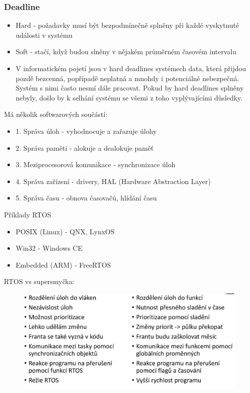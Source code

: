 \subsubsection*{Deadline}
\begin{itemize}
  \item Hard - požadavky musí být bezpodmínečně splněny při každé vyskytnuté události v systému
  \item Soft - stačí, když budou slněny v nějakém průměrném časovém intervalu
  \item V informatickém pojetí jsou v hard deadlines systémech data, která přijdou pozdě bezcenná, popřípadě neplatná a mnohdy i potenciálně nebezpečná. Systém s nimi často nesmí dále pracovat. Pokud by hard deadlines splněny nebyly, došlo by k selhání systému se všemi z toho vyplývajícími důsledky.
\end{itemize}
Má několik softwarových součástí:
\begin{itemize}
  \item 1. Správa úloh - vyhodnocuje a zařazuje úlohy
  \item 2. Správa paměti - alokuje a dealokuje paměť 
  \item 3. Meziprocesorová komunikace - synchronizace úloh
  \item 4. Správa zařízení - drivery, HAL (Hardware Abstraction Layer)
  \item 5. Správa času - obnova časovačů, hlídání času
\end{itemize}

Příklady RTOS
\begin{itemize}
  \item POSIX (Linux) - QNX, LynxOS
  \item Win32 - Windows CE
  \item Embedded (ARM) - FreeRTOS
\end{itemize}

RTOS vs supersmyčka:
\begin{figure}[h]
  \begin{center}
    \includegraphics[width = \textwidth]{img/Picture25.png}
  \end{center}
\end{figure}

